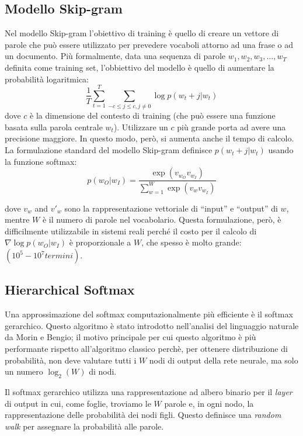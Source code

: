 \documentclass[a4paper,12pt,openright,twoside]{report}
\theoremstyle{definition}
\begin{document}
\subsection{Modello Skip-gram}
Nel modello Skip-gram l'obiettivo di training è quello di creare un vettore di parole che
può essere utilizzato per prevedere vocaboli attorno ad una frase o ad un documento. Più formalmente,
data una sequenza di parole $w_1,w_2,w_3,\ldots,w_T$ definita come training set, 
l'obbiettivo del modello è quello di aumentare la
probabilità logaritmica:
\begin{equation}
	\frac{1}{T} \sum_{t=1}^{T} \sum_{-c\leq j\leq c,j\neq0} \log p(w_t+j|w_t)
	\label{eq:prob log}
\end{equation}
dove $c$ è la dimensione del contesto di training (che può essere una funzione basata sulla parola centrale $w_t$).
Utilizzare un $c$ più grande porta ad avere una precisione maggiore. In questo modo, però, si aumenta anche il 
tempo di calcolo. La formulazione standard del modello Skip-gram definisce $p(w_t+j|w_t)$ usando la funzione
softmax:
\begin{equation}
	p(w_O|w_I) = \frac{\exp(v_{w_O} v_{w_I})}{\sum_{w=1}^{W}\exp(v_w v_{w_I})}
	\label{eq:softmax}
\end{equation}

dove $v_w$ and $v'_w$ sono la rappresentazione vettoriale di ``input'' e ``output'' di $w$, mentre $W$ è il numero
di parole nel vocabolario.
Questa formulazione, però, è difficilmente utilizzabile in sistemi reali
perché il costo per il calcolo di $\nabla\log p(w_O|w_I)$
è proporzionale a $W$, che spesso è molto grande: $(10^5-10^7 termini)$.

\subsection{Hierarchical Softmax}
Una approssimazione del softmax computazionalmente più efficiente è il softmax gerarchico. Questo algoritmo
è stato introdotto nell'analisi del linguaggio naturale da Morin e Bengio; il motivo principale
per cui questo algoritmo è più performante rispetto all'algoritmo classico
perchè, per ottenere distribuzione di probabilità, non deve valutare tutti i $W$
 nodi di output della rete neurale, ma solo un numero  $\log_2(W)$ di nodi.

Il softmax gerarchico utilizza una rappresentazione ad albero binario per il \emph{layer} di output 
in cui, come foglie,
troviamo le $W$ parole e, in ogni nodo, la rappresentazione delle probabilità dei nodi figli.
Questo definisce una \emph{random walk} per assegnare la probabilità alle parole.
\end{document}
